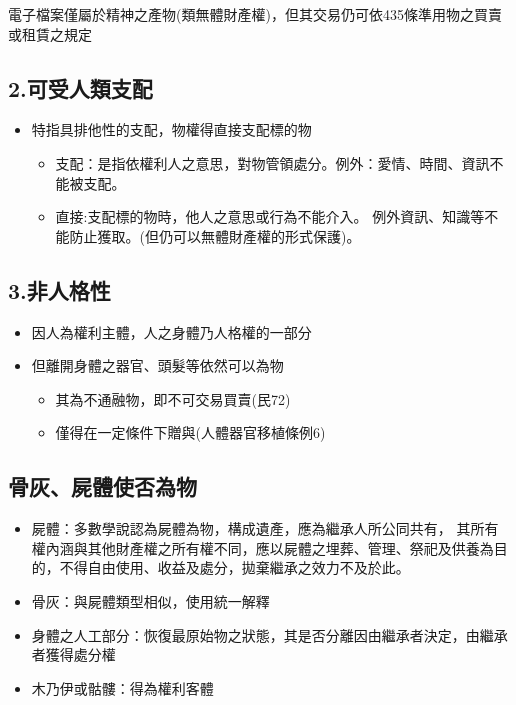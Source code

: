 \documentclass[
]{book}
\begin{document}
電子檔案僅屬於精神之產物(類無體財產權)，但其交易仍可依435條準用物之買賣或租賃之規定

\hypertarget{ux53efux53d7ux4ebaux985eux652fux914d}{%
\subsection{2.可受人類支配}\label{ux53efux53d7ux4ebaux985eux652fux914d}}

\begin{itemize}
\item
  特指具排他性的支配，物權得直接支配標的物

  \begin{itemize}
  \item
    支配：是指依權利人之意思，對物管領處分。例外：愛情、時間、資訊不能被支配。
  \item
    直接:支配標的物時，他人之意思或行為不能介入。
    例外資訊、知識等不能防止獲取。(但仍可以無體財產權的形式保護)。
  \end{itemize}
\end{itemize}

\hypertarget{ux975eux4ebaux683cux6027}{%
\subsection{3.非人格性}\label{ux975eux4ebaux683cux6027}}

\begin{itemize}
\item
  因人為權利主體，人之身體乃人格權的一部分
\item
  但離開身體之器官、頭髮等依然可以為物

  \begin{itemize}
  \item
    其為不通融物，即不可交易買賣(民72)
  \item
    僅得在一定條件下贈與(人體器官移植條例6)
  \end{itemize}
\end{itemize}

\pagebreak

\hypertarget{ux9aa8ux7070ux5c4dux9ad4ux4f7fux5426ux70baux7269}{%
\subsection{骨灰、屍體使否為物}\label{ux9aa8ux7070ux5c4dux9ad4ux4f7fux5426ux70baux7269}}

\begin{itemize}
\item
  屍體：多數學說認為屍體為物，構成遺產，應為繼承人所公同共有， 其所有權內涵與其他財產權之所有權不同，應以屍體之埋葬、管理、祭祀及供養為目的，不得自由使用、收益及處分，拋棄繼承之效力不及於此。
\item
  骨灰：與屍體類型相似，使用統一解釋
\item
  身體之人工部分：恢復最原始物之狀態，其是否分離因由繼承者決定，由繼承者獲得處分權
\item
  木乃伊或骷髏：得為權利客體
\end{itemize}
\end{document}
